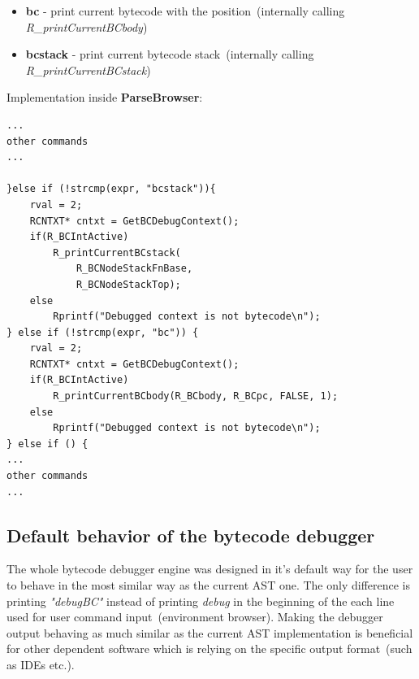 \documentclass[thesis=M,english]{FITthesis}[2018/10/20]
\begin{document}
\begin{itemize}
	\item \textbf{bc} - print current bytecode with the position~(internally calling \textit{R{\_}printCurrentBCbody})
	\item \textbf{bcstack} - print current bytecode stack~(internally calling \textit{R{\_}printCurrentBCstack})
\end{itemize}

Implementation inside \textbf{ParseBrowser}:
\begin{lstlisting}
...
other commands
...

}else if (!strcmp(expr, "bcstack")){
    rval = 2;
    RCNTXT* cntxt = GetBCDebugContext();
    if(R_BCIntActive)
        R_printCurrentBCstack(
            R_BCNodeStackFnBase, 
            R_BCNodeStackTop);
    else
        Rprintf("Debugged context is not bytecode\n");
} else if (!strcmp(expr, "bc")) {
    rval = 2;
    RCNTXT* cntxt = GetBCDebugContext();
    if(R_BCIntActive)
        R_printCurrentBCbody(R_BCbody, R_BCpc, FALSE, 1);
    else
        Rprintf("Debugged context is not bytecode\n");
} else if () {
...
other commands
...
\end{lstlisting}




\subsection{Default behavior of the bytecode debugger}

The whole bytecode debugger engine was designed in it's default way for the user to behave in the most similar way as the current AST one. The only difference is printing \textit{"debugBC"} instead of printing \textit{debug} in the beginning of the each line used for user command input~(environment browser). Making the debugger output behaving as much similar as the current AST implementation is beneficial for other dependent software which is relying on the specific output format~(such as IDEs etc.).
\end{document}
